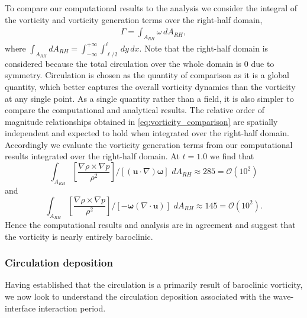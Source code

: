 \documentclass{article}
\newcommand{\orderof}[1]{\ensuremath{\mathcal{O}\left(#1\right)}}
\begin{document}
To compare our computational results to the analysis we consider the
integral of the vorticity and vorticity generation terms over the
right-half domain,
\begin{align}
  \Gamma = \int_{A_{RH}} \omega \,dA_{RH},
\end{align}
where
$\int_{A_{RH}} dA_{RH} =
\int_{-\infty}^{+\infty}\int_{\ell/2}^{\ell} \,dy\, dx$. Note
that the right-half domain is considered because the total circulation
over the whole domain is $0$ due to symmetry. Circulation is chosen as
the quantity of comparison as it is a global quantity, which better
captures the overall vorticity dynamics than the vorticity at any
single point. As a single quantity rather than a field, it is also
simpler to compare the computational and analytical results. The
relative order of magnitude relationships obtained in
\eqref{eq:vorticity_comparison} are spatially independent and expected
to hold when integrated over the right-half domain. Accordingly we
evaluate the vorticity generation terms from our computational results
integrated over the right-half domain. At $t=1.0$ we find that %
$$ \int_{A_{RH}} \left[\frac{\nabla\rho\times\nabla p}{\rho^2}\right] / \left[\left(\boldsymbol{u}\cdot\nabla\right)\boldsymbol{\omega}\right]\,\,dA_{RH}\approx 285=\orderof{10^2}$$
and
$$ \int_{A_{RH}} \left[\frac{\nabla\rho\times\nabla p}{\rho^2}\right] / \left[-\boldsymbol{\omega}\left(\nabla\cdot\boldsymbol{u}\right)\right]\,\,dA_{RH} \approx 145=\orderof{10^2}.$$%
%
Hence the computational results and analysis are in agreement and suggest
that the vorticity is nearly entirely baroclinic.
% 
% 
\subsubsection{Circulation deposition}
Having established that the circulation is a primarily result of
baroclinic vorticity, we now look to understand the circulation
deposition associated with the wave-interface interaction period.
\end{document}
